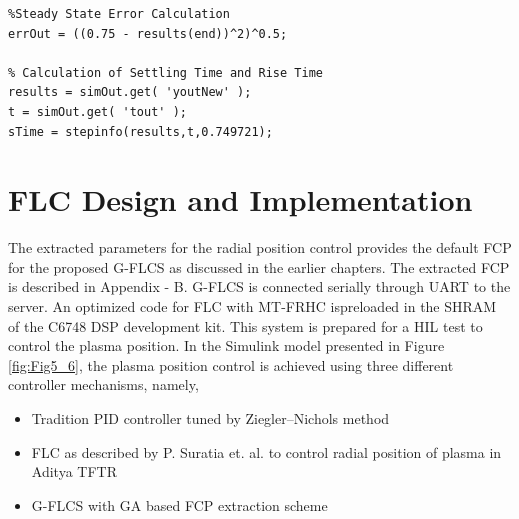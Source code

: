 \begin{lstlisting}
%Steady State Error Calculation
errOut = ((0.75 - results(end))^2)^0.5; 

% Calculation of Settling Time and Rise Time
results = simOut.get( 'youtNew' );
t = simOut.get( 'tout' );
sTime = stepinfo(results,t,0.749721);
\end{lstlisting}

\section{FLC Design and Implementation}
The extracted parameters for the radial position control provides the default FCP for the proposed G-FLCS as discussed in the earlier chapters. The extracted FCP is described in Appendix - B. G-FLCS is connected serially through UART to the server. An optimized code for FLC with MT-FRHC ispreloaded in the SHRAM of the C6748 DSP development kit. This system is prepared for a HIL test to control the plasma position. In the Simulink model presented in Figure \ref{fig:Fig5_6}, the plasma position control is achieved using three different controller mechanisms, namely, 
\begin{itemize}
	\item Tradition PID controller tuned by Ziegler--Nichols method
	\item FLC as described by P. Suratia et. al. to control radial position of plasma in Aditya TFTR
	\item G-FLCS with GA based FCP extraction scheme
\end{itemize}
